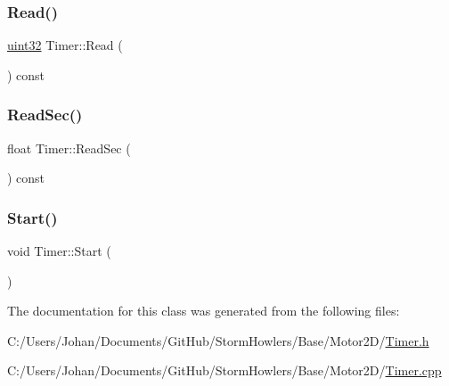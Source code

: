 \subsubsection{\texorpdfstring{Read()}{Read()}}
{\footnotesize\ttfamily \mbox{\hyperlink{_defs_8h_ada4c95a4173a4bb540c8a7f80f3665d2}{uint32}} Timer\+::\+Read (\begin{DoxyParamCaption}{ }\end{DoxyParamCaption}) const}

\mbox{\label{class_timer_af19579fc19223d2de4a5d0eb3834b8a7}} 
\subsubsection{\texorpdfstring{ReadSec()}{ReadSec()}}
{\footnotesize\ttfamily float Timer\+::\+Read\+Sec (\begin{DoxyParamCaption}{ }\end{DoxyParamCaption}) const}

\mbox{\label{class_timer_a4e607b129b392c11adddd9641a320436}} 
\subsubsection{\texorpdfstring{Start()}{Start()}}
{\footnotesize\ttfamily void Timer\+::\+Start (\begin{DoxyParamCaption}{ }\end{DoxyParamCaption})}



The documentation for this class was generated from the following files\+:\begin{DoxyCompactItemize}
\item 
C\+:/\+Users/\+Johan/\+Documents/\+Git\+Hub/\+Storm\+Howlers/\+Base/\+Motor2\+D/\mbox{\hyperlink{_timer_8h}{Timer.\+h}}\item 
C\+:/\+Users/\+Johan/\+Documents/\+Git\+Hub/\+Storm\+Howlers/\+Base/\+Motor2\+D/\mbox{\hyperlink{_timer_8cpp}{Timer.\+cpp}}\end{DoxyCompactItemize}
